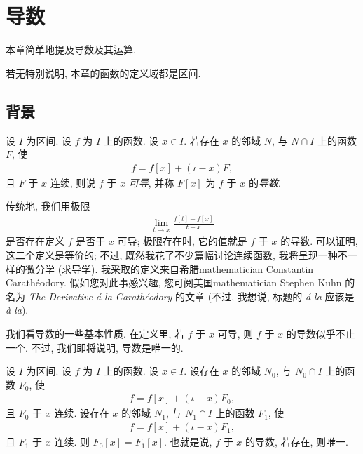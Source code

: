 \chapter{导数}

本章简单地提及导数及其运算.

若无特别说明, 本章的函数的定义域都是区间.

\section{背景}

\begin{definition}
    设 $I$ 为区间.
    设 $f$ 为 $I$ 上的函数.
    设 $x \in I$.
    若存在 $x$ 的邻域 $N$, 与 $N \cap I$ 上的函数 $F$, 使
    \begin{align*}
        f = f[x] + (\iota - x)F,
    \end{align*}
    且 $F$ 于 $x$ 连续,
    则说 $f$ 于 $x$ \emph{可导},
    并称 $F[x]$ 为 $f$ 于 $x$ 的\emph{导数}.
\end{definition}

\begin{remark}
    传统地, 我们用极限
    \begin{align*}
        \lim_{t \to x} {\frac{f[t] - f[x]}{t - x}}
    \end{align*}
    是否存在定义 $f$ 是否于 $x$ 可导;
    极限存在时, 它的值就是 $f$ 于 $x$ 的导数.
    可以证明, 这二个定义是等价的;
    不过, 既然我花了不少篇幅讨论连续函数,
    我将呈现一种不一样的微分学 (求导学).
    我采取的定义来自希腊\gls{mathematician}
    Constantin Carath\'eodory.
    假如您对此事感兴趣,
    您可阅美国\gls{mathematician} Stephen Kuhn 的名为
    \textit{The Derivative \'a la Carath\'eodory} 的文章
    (不过, 我想说,
    标题的 \textit{\'a la} 应该是 \textit{\`a la}).
\end{remark}

我们看导数的一些基本性质.
在定义里, 若 $f$ 于 $x$ 可导, 则 $f$ 于 $x$ 的导数似乎不止一个.
不过, 我们即将说明, 导数是唯一的.

\begin{theorem}
    设 $I$ 为区间.
    设 $f$ 为 $I$ 上的函数.
    设 $x \in I$.
    设存在 $x$ 的邻域 $N_0$, 与 $N_0 \cap I$ 上的函数 $F_0$, 使
    \begin{align*}
        f = f[x] + (\iota - x) F_0,
    \end{align*}
    且 $F_0$ 于 $x$ 连续.
    设存在 $x$ 的邻域 $N_1$, 与 $N_1 \cap I$ 上的函数 $F_1$, 使
    \begin{align*}
        f = f[x] + (\iota - x) F_1,
    \end{align*}
    且 $F_1$ 于 $x$ 连续.
    则 $F_0 [x] = F_1 [x]$.
    也就是说, $f$ 于 $x$ 的导数, 若存在, 则唯一.
\end{theorem}

